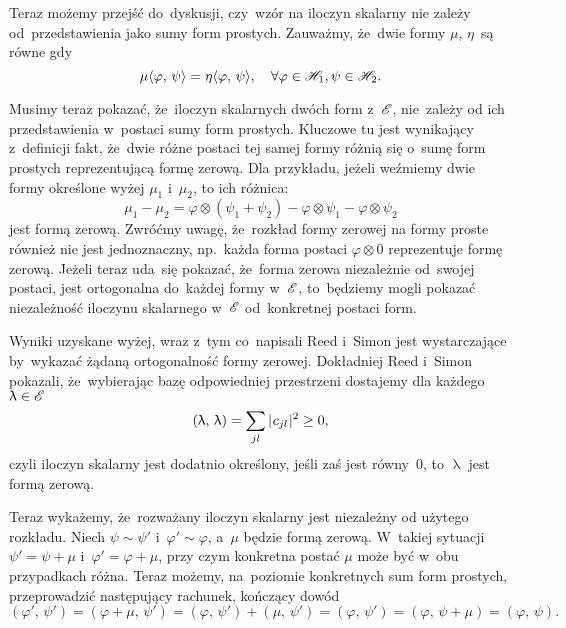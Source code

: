 \documentclass[a4paper,11pt]{article}
\numberwithin{equation}{section}
\renewcommand{\lambda}{\uplambda}
\begin{document}
Teraz możemy przejść do~dyskusji, czy~wzór na iloczyn skalarny nie
zależy od~przedstawienia jako sumy form prostych. Zauważmy, że~dwie
formy $\mu$, $\eta$~są równe gdy
\begin{equation}
  \label{eq:RS-Vol-I-s01-37}
  \mu\langle \varphi, \, \psi \rangle = \eta\langle \varphi, \, \psi \rangle, \quad
  \forall \varphi \in \mathcal{H}_{ 1 }, \psi \in \mathcal{H}_{ 2 }.
\end{equation}

Musimy teraz pokazać, że~iloczyn skalarnych dwóch form z~$\mathcal{E}$,
nie~zależy od ich przedstawienia w~postaci sumy form prostych.
Kluczowe tu jest wynikający z~definicji fakt, że~dwie różne postaci
tej samej formy różnią się o~sumę form prostych reprezentującą formę
zerową. Dla przykładu, jeżeli weźmiemy dwie formy określone wyżej
$\mu_{ 1 }$ i~$\mu_{ 2 }$, to ich różnica:
\begin{equation}
  \label{eq:RS-Vol-I-s01-38}
  \mu_{ 1 } - \mu_{ 2 } =
  \varphi \otimes ( \psi_{ 1 } + \psi_{ 2 } ) - \varphi \otimes \psi_{ 1 } - \varphi \otimes \psi_{ 2 }
\end{equation}
jest formą zerową. Zwróćmy uwagę, że~rozkład formy zerowej na formy
proste również nie jest jednoznaczny, np.~każda forma postaci
$\varphi \otimes 0$ reprezentuje formę zerową. Jeżeli teraz uda~się pokazać,
że~forma zerowa niezależnie od~swojej postaci, jest ortogonalna
do~każdej formy w~$\mathcal{E}$, to~będziemy mogli pokazać niezależność
iloczynu skalarnego w~$\mathcal{E}$ od~konkretnej postaci form.

Wyniki uzyskane wyżej, wraz z~tym co~napisali Reed i~Simon jest
wystarczające by~wykazać żądaną ortogonalność formy zerowej.
Dokładniej Reed i~Simon pokazali, że~wybierając bazę odpowiedniej
przestrzeni dostajemy dla każdego $\lambda \in \Ecal$
\begin{equation}
  \label{eq:RS-Vol-I-s01-39}
  ( \lambda, \, \lambda ) = \sum_{ j l } \absOne{ c_{ j l } }^{ 2 } \geq 0,
\end{equation}
czyli iloczyn skalarny jest dodatnio określony, jeśli zaś jest
równy~0, to $\lambda$ jest formą zerową.

Teraz wykażemy, że~rozważany iloczyn skalarny jest niezależny od
użytego rozkładu. Niech $\psi \sim \psi'$ i~$\varphi' \sim \varphi$, a~$\mu$
będzie formą zerową. W~takiej sytuacji $\psi' = \psi + \mu$
i~$\varphi' = \varphi + \mu$, przy czym konkretna postać $\mu$ może być w~obu
przypadkach różna. Teraz możemy, na~poziomie konkretnych sum form
prostych, przeprowadzić następujący rachunek, kończący dowód
\begin{equation}
  \label{eq:RS-Vol-I-s01-40}
  ( \varphi', \, \psi' ) = ( \varphi + \mu, \, \psi' )
  = ( \varphi, \, \psi' ) + ( \mu, \, \psi' ) = ( \varphi, \, \psi' )
  = ( \varphi, \, \psi + \mu ) = ( \varphi, \, \psi ).
\end{equation}
\end{document}
